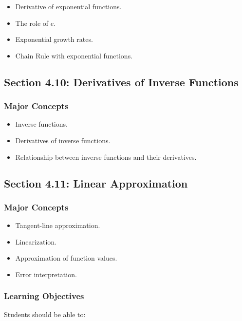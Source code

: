 \documentclass[11pt]{article}
\begin{document}
\begin{itemize}
    \item Derivative of exponential functions.
    \item The role of $e$.
    \item Exponential growth rates.
    \item Chain Rule with exponential functions.
\end{itemize}

\subsection{Section 4.10: Derivatives of Inverse Functions}

\subsubsection{Major Concepts}

\begin{itemize}
    \item Inverse functions.
    \item Derivatives of inverse functions.
    \item Relationship between inverse functions and their derivatives.
\end{itemize}

\subsection{Section 4.11: Linear Approximation}

\subsubsection{Major Concepts}

\begin{itemize}
    \item Tangent-line approximation.
    \item Linearization.
    \item Approximation of function values.
    \item Error interpretation.
\end{itemize}

\subsubsection{Learning Objectives}

Students should be able to:
\end{document}
